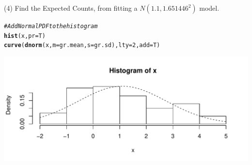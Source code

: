 \documentclass[t,xcolor=pdftex,dvipsnames,table]{beamer}
\makeatletter
\def\maxwidth{ %
  \ifdim\Gin@nat@width>\linewidth
    \linewidth
  \else
    \Gin@nat@width
  \fi
}
\newcommand{\hlnum}[1]{\textcolor[rgb]{0.686,0.059,0.569}{#1}}%
\newcommand{\hlcom}[1]{\textcolor[rgb]{0.678,0.584,0.686}{\textit{#1}}}%
\newcommand{\hlstd}[1]{\textcolor[rgb]{0.345,0.345,0.345}{#1}}%
\newcommand{\hlkwc}[1]{\textcolor[rgb]{0.333,0.667,0.333}{#1}}%
\newcommand{\hlkwd}[1]{\textcolor[rgb]{0.737,0.353,0.396}{\textbf{#1}}}%
\newenvironment{kframe}{%
 \def\at@end@of@kframe{}%
 \ifinner\ifhmode%
  \def\at@end@of@kframe{\end{minipage}}%
  \begin{minipage}{\columnwidth}%
 \fi\fi%
 \def\FrameCommand##1{\hskip\@totalleftmargin \hskip-\fboxsep
 \colorbox{shadecolor}{##1}\hskip-\fboxsep
     \hskip-\linewidth \hskip-\@totalleftmargin \hskip\columnwidth}%
 \MakeFramed {\advance\hsize-\width
   \@totalleftmargin\z@ \linewidth\hsize
   \@setminipage}}%
 {\par\unskip\endMakeFramed%
 \at@end@of@kframe}
\newenvironment{knitrout}{}{} %
\makeatother
\begin{document}
\begin{frame}[fragile]{}
(4) Find the Expected Counts, from fitting a $N(1.1, 1.651446^2)$ model.

\begin{knitrout}
\color{fgcolor}\begin{kframe}
\begin{alltt}
\hlcom{#Add Normal PDF to the histogram}
\hlkwd{hist}\hlstd{(x,} \hlkwc{pr}\hlstd{=T)}
\hlkwd{curve}\hlstd{(}\hlkwd{dnorm}\hlstd{(x,}\hlkwc{m}\hlstd{=gr.mean,}\hlkwc{s}\hlstd{=gr.sd),}\hlkwc{lty}\hlstd{=}\hlnum{2}\hlstd{,}\hlkwc{add}\hlstd{=T)}
\end{alltt}
\end{kframe}
\includegraphics[width=\maxwidth]{figure/unnamed-chunk-25-1} 

\end{knitrout}
\end{frame}
\end{document}
